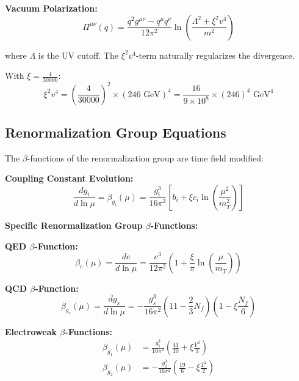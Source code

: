 \documentclass[12pt,a4paper]{report}
\newcommand{\xipar}{\xi}      %
\begin{document}
\textbf{Vacuum Polarization:}
\begin{equation}\label{eq:vacuum_polarization_t0}
	\Pi^{\mu\nu}(q) = \frac{q^2 g^{\mu\nu} - q^\mu q^\nu}{12\pi^2} \ln\left(\frac{\Lambda^2 + \xipar^2 v^4}{m^2}\right)
\end{equation}

where $\Lambda$ is the UV cutoff. The $\xipar^2 v^4$-term naturally regularizes the divergence.

With $\xipar = \frac{4}{30000}$:
\begin{equation}
	\xipar^2 v^4 = \left(\frac{4}{30000}\right)^2 \times (246 \text{ GeV})^4 = \frac{16}{9 \times 10^8} \times (246)^4 \text{ GeV}^4
\end{equation}

	\subsection{Renormalization Group Equations}\label{subsec:renormalization_group_t0}
	
	The $\beta$-functions of the renormalization group are time field modified:
	
	\textbf{Coupling Constant Evolution:}
	\begin{equation}
		\frac{dg_i}{d\ln\mu} = \beta_{g_i}(\mu) = \frac{g_i^3}{16\pi^2} \left[b_i + \xipar c_i \ln\left(\frac{\mu^2}{m_T^2}\right)\right]
	\end{equation}
	
	\textbf{Specific Renormalization Group $\beta$-Functions:}
	
	\textbf{QED $\beta$-Function:}
	\begin{equation}
		\beta_e(\mu) = \frac{de}{d\ln\mu} = \frac{e^3}{12\pi^2} \left(1 + \frac{\xipar}{\pi} \ln\left(\frac{\mu}{m_T}\right)\right)
	\end{equation}
	
	\textbf{QCD $\beta$-Function:}
	\begin{equation}
		\beta_{g_s}(\mu) = \frac{dg_s}{d\ln\mu} = -\frac{g_s^3}{16\pi^2} \left(11 - \frac{2}{3} N_f\right) \left(1 - \xipar \frac{N_f}{6}\right)
	\end{equation}
	
	\textbf{Electroweak $\beta$-Functions:}
	\begin{align}
		\beta_{g_1}(\mu) &= \frac{g_1^3}{16\pi^2} \left(\frac{41}{10} + \xipar \frac{Y^2}{3}\right) \\
		\beta_{g_2}(\mu) &= -\frac{g_2^3}{16\pi^2} \left(\frac{19}{6} - \xipar \frac{T^2}{2}\right)
	\end{align}
	
\end{document}
